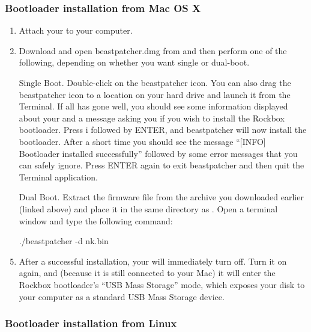 \subsubsection{Bootloader installation from Mac OS X}
\begin{enumerate}
\item Attach your \dap{} to your computer.

\item Download and open beastpatcher.dmg from 
 and then perform one of the following,
depending on whether you want single or dual-boot.

\item [Single Boot.] Double-click on the beastpatcher icon. You can also
drag the beastpatcher icon to a location on your hard drive and launch
it from the Terminal. If all has gone well, you should see some 
information displayed about your \dap{} and a message asking you if you 
wish to install the Rockbox bootloader. Press i followed by ENTER, and 
beastpatcher will now install the bootloader. After a short time you 
should see the message ``[INFO] Bootloader installed successfully''
followed by some error messages that you can safely ignore. Press 
ENTER again to exit beastpatcher and then quit the Terminal application.

\item [Dual Boot.] Extract the \playerman{} firmware file 
from the archive you downloaded earlier (linked above) and place it in the
same directory as .  Open a terminal window and type the
following command:

\begin{code} 
    ./beastpatcher -d nk.bin
\end{code}

\item After a successful installation, your \dap{} will immediately turn off.
Turn it on again, and (because it is still connected to your Mac)
it will enter the Rockbox bootloader's
``USB Mass Storage'' mode, which exposes your \daps{} disk to your computer
as a standard USB Mass Storage device.
\end{enumerate}

\subsubsection{Bootloader installation from Linux}

